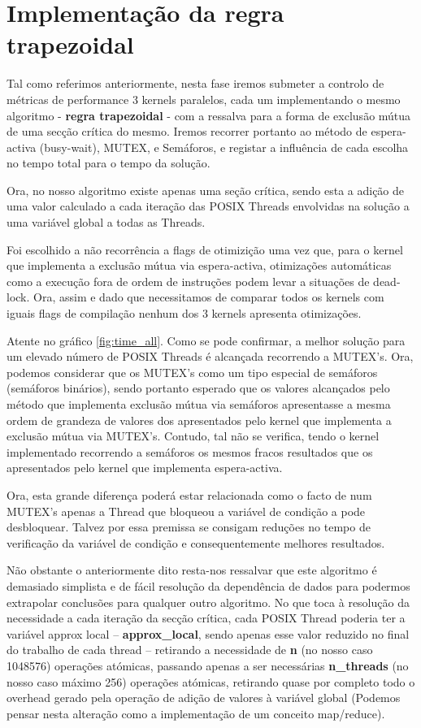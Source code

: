 \documentclass[conference,compsoc]{IEEEtran}
\begin{document}
\section{Implementação da regra trapezoidal }
Tal como referimos anteriormente, nesta fase iremos submeter a controlo de métricas de performance  3 kernels paralelos, cada um implementando o mesmo algoritmo - \textbf{regra trapezoidal} - com a ressalva para a forma de exclusão mútua de uma secção crítica do mesmo. Iremos recorrer portanto ao método de espera-activa (busy-wait), MUTEX, e Semáforos, e registar a influência de cada escolha no tempo total para o tempo da solução. \par 
Ora, no nosso algoritmo existe apenas uma seção crítica, sendo esta a adição de uma valor calculado a cada iteração das POSIX Threads envolvidas na solução a uma variável global a todas as Threads. \par
Foi escolhido a não recorrência a flags de otimizição uma vez que, para o kernel que implementa a exclusão mútua via espera-activa, otimizações automáticas como a execução fora de ordem de instruções podem levar a situações de dead-lock. Ora, assim e dado que necessitamos de comparar todos os kernels com iguais flags de compilação nenhum dos 3 kernels apresenta otimizações.\par 
Atente no gráfico \ref{fig:time_all}. Como se pode confirmar, a melhor solução para um elevado número de POSIX Threads é alcançada recorrendo a MUTEX's. Ora, podemos considerar que os MUTEX's como um tipo especial de semáforos (semáforos binários), sendo portanto esperado que os valores alcançados pelo método que implementa exclusão mútua via semáforos apresentasse a mesma ordem de grandeza de valores dos apresentados pelo kernel que implementa a exclusão mútua via MUTEX's. Contudo, tal não se verifica, tendo o kernel  implementado recorrendo a semáforos os mesmos fracos resultados que os apresentados pelo kernel que implementa espera-activa.\par 
Ora, esta grande diferença poderá estar relacionada como o facto de num MUTEX's apenas a Thread que bloqueou a variável de condição a pode desbloquear. Talvez por essa premissa se consigam reduções no tempo de verificação da variável de condição e consequentemente melhores resultados.\par 
Não obstante o anteriormente dito resta-nos ressalvar que este algoritmo é demasiado simplista e de fácil resolução da dependência de dados para podermos extrapolar conclusões para qualquer outro algoritmo. No que toca à resolução da necessidade a cada iteração da secção crítica, cada POSIX Thread poderia ter a variável approx local -- \textbf{approx\_local}, sendo apenas esse valor reduzido no final do trabalho de cada thread -- retirando a necessidade de \textbf{n} (no nosso caso 1048576)  operações atómicas, passando apenas a ser necessárias \textbf{n\_threads} (no nosso caso máximo 256) operações atómicas, retirando quase por completo todo o overhead gerado pela operação de adição de valores à variável global (Podemos pensar nesta alteração como a implementação de um conceito map/reduce).
\end{document}
